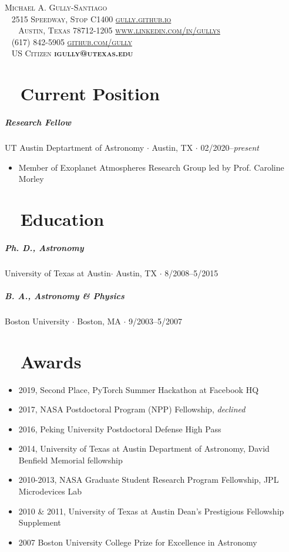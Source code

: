 \documentclass[10pt,letterpaper]{article}
\newcommand{\namestyle}{\Huge \scshape}
\newcommand{\addressstyle}{\color{addresscolor}  \footnotesize \sffamily \upshape}
\begin{document}
\begin{flushleft}
    \namestyle Michael A. Gully-Santiago \\[0.3em]
    \addressstyle
    \faMapMarked* ~ 2515 Speedway, Stop C1400  \hfill \url{gully.github.io} ~ \faLink \\
    ~ ~ Austin, Texas 78712-1205  \hfill  \url{www.linkedin.com/in/gullys} ~ \faLinkedinIn \\
    \faPhone ~ (617) 842-5905 \hfill \url{github.com/gully} ~ \faGithub \\
    \faFlagUsa ~ US Citizen \hfill \textbf{igully@utexas.edu} ~ \faAt\\

\end{flushleft}

\small

\section*{\faToggleOn ~ Current Position}

\subparagraph{Research Fellow}
UT Austin Deptartment of Astronomy $\cdot$ Austin, TX $\cdot$ 02/2020--\emph{present}
\begin{itemize}
    \item Member of Exoplanet Atmospheres Research Group led by Prof. Caroline Morley
\end{itemize}

\section*{\faGraduationCap ~ Education}

\subparagraph{Ph. D., Astronomy}
University of Texas at Austin$\cdot$ Austin, TX $\cdot$ 8/2008--5/2015

\subparagraph{B. A., Astronomy \& Physics}
Boston University $\cdot$ Boston, MA $\cdot$ 9/2003--5/2007


\section*{\faTrophy ~ Awards}

\begin{itemize}
    \item 2019, Second Place, PyTorch Summer Hackathon at Facebook HQ
    \item 2017, NASA Postdoctoral Program (NPP) Fellowship,  \emph{declined}
    \item 2016, Peking University Postdoctoral Defense High Pass
    \item 2014, University of Texas at Austin Department of Astronomy, David Benfield Memorial fellowship
    \item 2010-2013, NASA Graduate Student Research Program Fellowship, JPL Microdevices Lab
    \item 2010 \& 2011, University of Texas at Austin Dean's Prestigious Fellowship Supplement
    \item 2007 Boston University College Prize for Excellence in Astronomy
\end{itemize}
\end{document}
